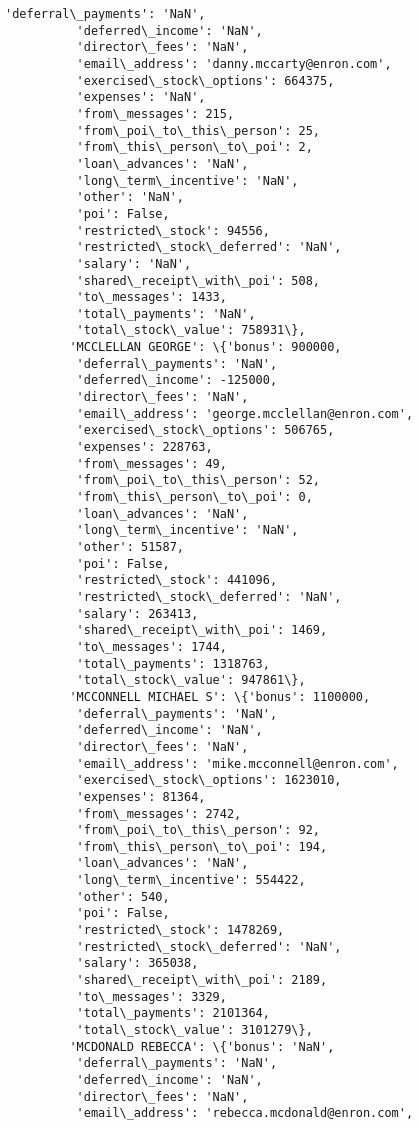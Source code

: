 \documentclass[11pt]{article}
\begin{document}
\begin{Verbatim}[commandchars=\\\{\}]
          'deferral\_payments': 'NaN',
          'deferred\_income': 'NaN',
          'director\_fees': 'NaN',
          'email\_address': 'danny.mccarty@enron.com',
          'exercised\_stock\_options': 664375,
          'expenses': 'NaN',
          'from\_messages': 215,
          'from\_poi\_to\_this\_person': 25,
          'from\_this\_person\_to\_poi': 2,
          'loan\_advances': 'NaN',
          'long\_term\_incentive': 'NaN',
          'other': 'NaN',
          'poi': False,
          'restricted\_stock': 94556,
          'restricted\_stock\_deferred': 'NaN',
          'salary': 'NaN',
          'shared\_receipt\_with\_poi': 508,
          'to\_messages': 1433,
          'total\_payments': 'NaN',
          'total\_stock\_value': 758931\},
         'MCCLELLAN GEORGE': \{'bonus': 900000,
          'deferral\_payments': 'NaN',
          'deferred\_income': -125000,
          'director\_fees': 'NaN',
          'email\_address': 'george.mcclellan@enron.com',
          'exercised\_stock\_options': 506765,
          'expenses': 228763,
          'from\_messages': 49,
          'from\_poi\_to\_this\_person': 52,
          'from\_this\_person\_to\_poi': 0,
          'loan\_advances': 'NaN',
          'long\_term\_incentive': 'NaN',
          'other': 51587,
          'poi': False,
          'restricted\_stock': 441096,
          'restricted\_stock\_deferred': 'NaN',
          'salary': 263413,
          'shared\_receipt\_with\_poi': 1469,
          'to\_messages': 1744,
          'total\_payments': 1318763,
          'total\_stock\_value': 947861\},
         'MCCONNELL MICHAEL S': \{'bonus': 1100000,
          'deferral\_payments': 'NaN',
          'deferred\_income': 'NaN',
          'director\_fees': 'NaN',
          'email\_address': 'mike.mcconnell@enron.com',
          'exercised\_stock\_options': 1623010,
          'expenses': 81364,
          'from\_messages': 2742,
          'from\_poi\_to\_this\_person': 92,
          'from\_this\_person\_to\_poi': 194,
          'loan\_advances': 'NaN',
          'long\_term\_incentive': 554422,
          'other': 540,
          'poi': False,
          'restricted\_stock': 1478269,
          'restricted\_stock\_deferred': 'NaN',
          'salary': 365038,
          'shared\_receipt\_with\_poi': 2189,
          'to\_messages': 3329,
          'total\_payments': 2101364,
          'total\_stock\_value': 3101279\},
         'MCDONALD REBECCA': \{'bonus': 'NaN',
          'deferral\_payments': 'NaN',
          'deferred\_income': 'NaN',
          'director\_fees': 'NaN',
          'email\_address': 'rebecca.mcdonald@enron.com',

\end{Verbatim}
\end{document}
